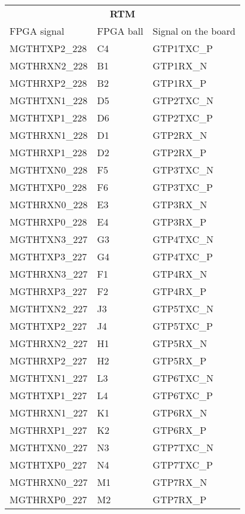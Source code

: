 \begin{footnotesize}
	\begin{longtable}{|p{7cm}|p{1cm}|p{5cm}|}
		\hline
		\multicolumn{3}{|c|}{\multirow{2}{*}{\textbf{\large{RTM}}}}\\
		\multicolumn{3}{|c|}{} \\ \hline 
FPGA signal	&	FPGA ball	&	Signal on the board	\\ \hline
MGTHTXP2\_228	&	C4	&	GTP1TXC\_P	\\ \hline
MGTHRXN2\_228	&	B1	&	GTP1RX\_N	\\ \hline
MGTHRXP2\_228	&	B2	&	GTP1RX\_P	\\ \hline
MGTHTXN1\_228	&	D5	&	GTP2TXC\_N	\\ \hline
MGTHTXP1\_228	&	D6	&	GTP2TXC\_P	\\ \hline
MGTHRXN1\_228	&	D1	&	GTP2RX\_N	\\ \hline
MGTHRXP1\_228	&	D2	&	GTP2RX\_P	\\ \hline
MGTHTXN0\_228	&	F5	&	GTP3TXC\_N	\\ \hline
MGTHTXP0\_228	&	F6	&	GTP3TXC\_P	\\ \hline
MGTHRXN0\_228	&	E3	&	GTP3RX\_N	\\ \hline
MGTHRXP0\_228	&	E4	&	GTP3RX\_P	\\ \hline
MGTHTXN3\_227	&	G3	&	GTP4TXC\_N	\\ \hline
MGTHTXP3\_227	&	G4	&	GTP4TXC\_P	\\ \hline
MGTHRXN3\_227	&	F1	&	GTP4RX\_N	\\ \hline
MGTHRXP3\_227	&	F2	&	GTP4RX\_P	\\ \hline
MGTHTXN2\_227	&	J3	&	GTP5TXC\_N	\\ \hline
MGTHTXP2\_227	&	J4	&	GTP5TXC\_P	\\ \hline
MGTHRXN2\_227	&	H1	&	GTP5RX\_N	\\ \hline
MGTHRXP2\_227	&	H2	&	GTP5RX\_P	\\ \hline
MGTHTXN1\_227	&	L3	&	GTP6TXC\_N	\\ \hline
MGTHTXP1\_227	&	L4	&	GTP6TXC\_P	\\ \hline
MGTHRXN1\_227	&	K1	&	GTP6RX\_N	\\ \hline
MGTHRXP1\_227	&	K2	&	GTP6RX\_P	\\ \hline
MGTHTXN0\_227	&	N3	&	GTP7TXC\_N	\\ \hline
MGTHTXP0\_227	&	N4	&	GTP7TXC\_P	\\ \hline
MGTHRXN0\_227	&	M1	&	GTP7RX\_N	\\ \hline
MGTHRXP0\_227	&	M2	&	GTP7RX\_P	\\ \hline

\end{longtable}
\end{footnotesize}
